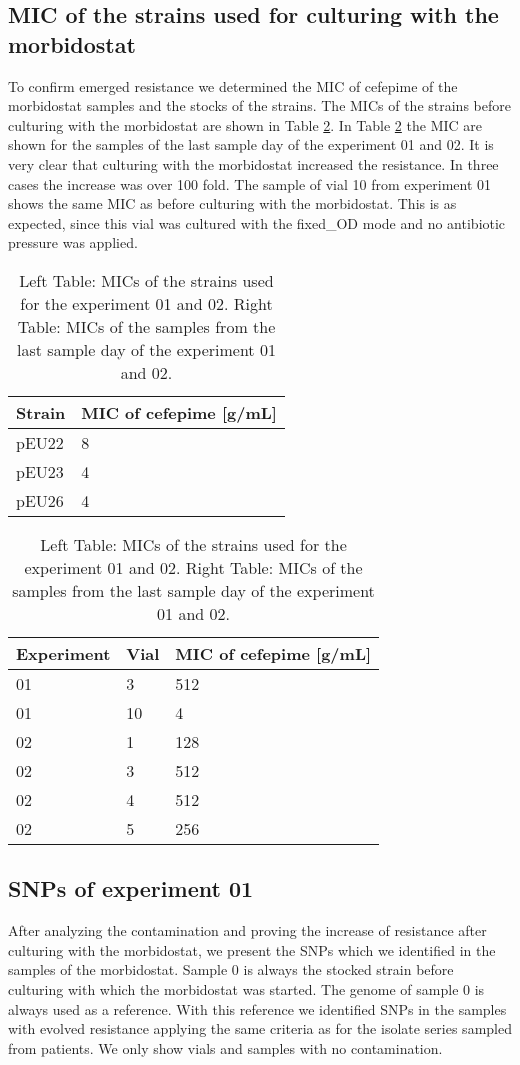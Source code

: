 \subsection{MIC of the strains used for culturing with the morbidostat}
To confirm emerged resistance we determined the MIC of cefepime of the morbidostat samples and the stocks of the strains.
The MICs of the strains before culturing with the morbidostat are shown in Table \ref{table:mics_finish}. In Table \ref{table:mics_finish} the MIC are shown for the samples of the last sample day of the experiment 01 and 02. It is very clear that culturing with the morbidostat increased the resistance. In three cases the increase was over 100 fold. The sample of vial 10 from experiment 01 shows the same MIC as before culturing with the morbidostat. This is as expected, since this vial was cultured with the fixed\_OD mode and no antibiotic pressure was applied.  
\begin{table}
	\begin{tabular}{|ll|}
		\hline
		Strain & MIC of cefepime [\textmu g/mL] \\ \hline
		pEU22  & 8   \\ \hline
		pEU23  & 4   \\ \hline
		pEU26  & 4   \\ \hline
	\end{tabular}
	\quad
	\begin{tabular}{|lll|}
		\hline
		Experiment & Vial & MIC of cefepime [\textmu g/mL] \\ \hline
		01         & 3    & 512                            \\ \hline
		01         & 10   & 4                              \\ \hline
		02         & 1    & 128                            \\ \hline
		02         & 3    & 512                            \\ \hline
		02         & 4    & 512                            \\ \hline
		02         & 5    & 256                            \\ \hline
	\end{tabular}
	\caption{Left Table: MICs of the strains used for the experiment 01 and 02. Right Table: MICs of the samples from the last sample day of the experiment 01 and 02.}
	\label{table:mics_finish}
\end{table}
\subsection{SNPs of experiment 01}
After analyzing the contamination and proving the increase of resistance after culturing with the morbidostat, we present the SNPs which we identified in the samples of the morbidostat. Sample 0 is always the stocked strain before culturing with which the morbidostat was started. The genome of sample 0 is always used as a reference. With this reference we identified SNPs in the samples with evolved resistance applying the same criteria as for the isolate series sampled from patients. We only show vials and samples with no contamination.
